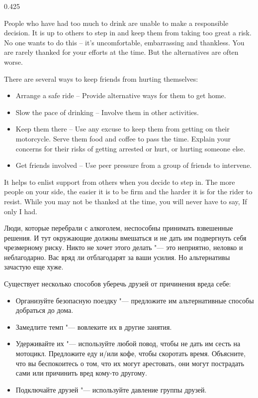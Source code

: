 \begin{langblock}{0.425}
	\begin{eng}
	
	People who have had too much to drink are unable to make a responsible decision. It is up to others to step in and keep them from taking too great a risk. No one wants to do this -- it's uncomfortable, embarrassing and thankless. You are rarely thanked for your efforts at the time. But the alternatives are often worse.
	
	There are several ways to keep friends from hurting themselves:
	
	\begin{itemize}[noitemsep]
		\item Arrange a safe ride -- Provide alternative ways for them to get home.
		\item Slow the pace of drinking -- Involve them in other activities.
		\item Keep them there -- Use any excuse to keep them from getting on their motorcycle. Serve them food and coffee to pass the time.  Explain your concerns for their risks of getting arrested or hurt, or hurting someone else.
		\item Get friends involved -- Use peer pressure from a group of friends to intervene.
	\end{itemize}
	It helps to enlist support from others when you decide to step in. The more people on your side, the easier it is to be firm and the harder it is for the rider to resist. While you may not be thanked at the time, you will never have to say, If only I had.
	\end{eng}
	\begin{rus}
		
		Люди, которые перебрали с алкоголем, неспособны принимать взвешенные решения. И тут окружающие должны вмешаться и не дать им подвергнуть себя чрезмерному риску. Никто не хочет этого делать "--- это неприятно, неловко и неблагодарно. Вас вряд ли отблагодарят за ваши усилия. Но альтернативы зачастую еще хуже.
		
		Существует несколько способов уберечь друзей от причинения вреда себе:
		
		\begin{itemize}[noitemsep]
			\item Организуйте безопасную поездку "--- предложите им альтернативные способы добраться до дома.
			\item Замедлите темп "--- вовлеките их в другие занятия.
			\item Удерживайте их "--- используйте любой повод, чтобы не дать им сесть на мотоцикл. Предложите еду и/или кофе, чтобы скоротать время.  Объясните, что вы беспокоитесь о том, что их могут арестовать, они могут пострадать сами или причинить вред кому-то другому.
			\item Подключайте друзей "--- используйте давление группы друзей.
		\end{itemize}
		

\end{rus}
\end{langblock}
